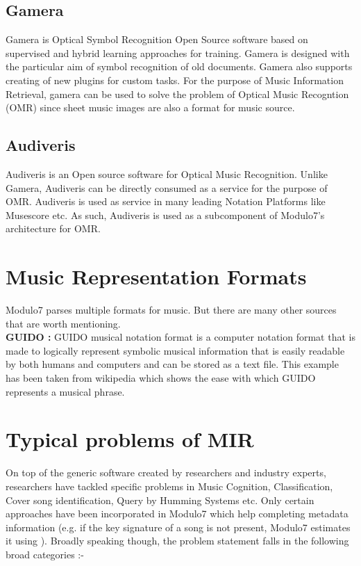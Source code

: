 \subsection{Gamera}

\noindent Gamera \cite{gamera} is Optical Symbol Recognition Open Source software based on supervised and hybrid learning approaches for training. Gamera is designed with the particular aim of symbol recognition of old documents. Gamera also supports creating of new plugins for custom tasks. For the purpose of Music Information Retrieval, gamera can be used to solve the problem of Optical Music Recogntion (OMR) since sheet music images are also a format for music source.

\subsection{Audiveris}

\noindent Audiveris is an Open source software for Optical Music Recognition. Unlike Gamera, Audiveris can be directly consumed as a service for the purpose of OMR.  Audiveris is used as service in many leading Notation Platforms like Musescore etc. As such, Audiveris is used as a subcomponent of Modulo7's architecture for OMR. 

\section{Music Representation Formats}

\noindent Modulo7 parses multiple formats for music. But there are many other sources that are worth mentioning. \\

\noindent \textbf{GUIDO :} GUIDO musical notation format is a computer notation format that is made to logically represent symbolic musical information that is easily readable by both humans and computers and can be stored as a text file. This example has been taken from wikipedia which shows the ease with which GUIDO represents a musical phrase. 

\section{Typical problems of MIR}

\noindent On top of the generic software created by researchers and industry experts, researchers have tackled specific problems in Music Cognition, Classification, Cover song identification, Query by Humming Systems etc. Only certain approaches have been incorporated in Modulo7 which help completing metadata information (e.g. if the key signature of a song is not present, Modulo7 estimates it using ). Broadly speaking though, the problem statement falls in the following broad categories :- 

